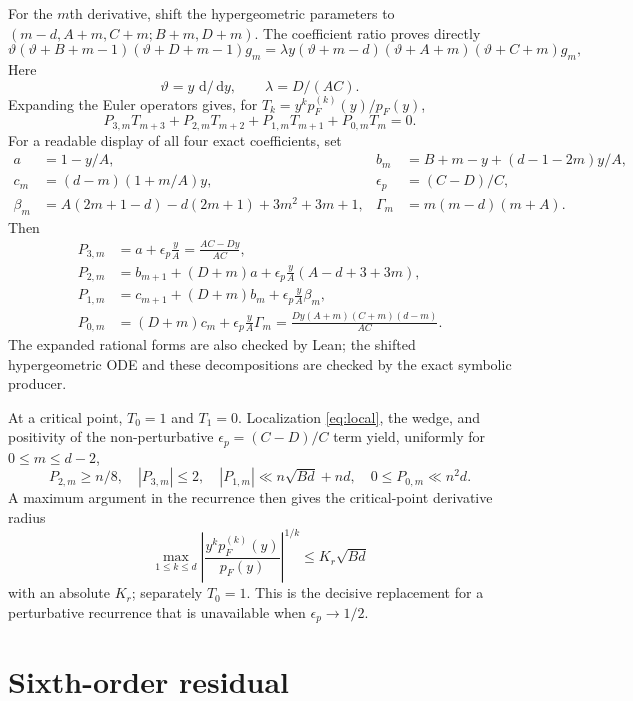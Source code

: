 \documentclass[11pt]{article}
\theoremstyle{definition}
\theoremstyle{remark}
\newcommand{\dd}{\,\mathrm d}
\begin{document}
For the $m$th derivative, shift the hypergeometric parameters to
$(m-d,A+m,C+m;B+m,D+m)$.  The coefficient ratio proves directly
\[
 \vartheta(\vartheta+B+m-1)(\vartheta+D+m-1)g_m
 =\lambda y(\vartheta+m-d)(\vartheta+A+m)(\vartheta+C+m)g_m,
\]
Here
\[
 \vartheta=y\,\dd/\dd y,\qquad \lambda=D/(AC).
\]
Expanding the Euler operators gives, for
$T_k=y^kp_F^{(k)}(y)/p_F(y)$,
\[
 P_{3,m}T_{m+3}+P_{2,m}T_{m+2}
 +P_{1,m}T_{m+1}+P_{0,m}T_m=0.
\]
For a readable display of all four exact coefficients, set
\begin{align*}
 a&=1-y/A,&
 b_m&=B+m-y+(d-1-2m)y/A,\\
 c_m&=(d-m)(1+m/A)y,&
 \epsilon_p&=(C-D)/C,\\
 \beta_m&=A(2m+1-d)-d(2m+1)+3m^2+3m+1,&
 \Gamma_m&=m(m-d)(m+A).
\end{align*}
Then
\begin{align*}
 P_{3,m}&=a+\epsilon_p\frac yA=\frac{AC-Dy}{AC},\\
 P_{2,m}&=b_{m+1}+(D+m)a
   +\epsilon_p\frac yA(A-d+3+3m),\\
 P_{1,m}&=c_{m+1}+(D+m)b_m
   +\epsilon_p\frac yA\beta_m,\\
 P_{0,m}&=(D+m)c_m+\epsilon_p\frac yA\Gamma_m
   =\frac{Dy(A+m)(C+m)(d-m)}{AC}.
\end{align*}
The expanded rational forms are also checked by Lean; the shifted
hypergeometric ODE and these decompositions are checked by the exact
symbolic producer.

At a critical point, $T_0=1$ and $T_1=0$.  Localization
\eqref{eq:local}, the wedge, and positivity of the non-perturbative
$\epsilon_p=(C-D)/C$ term yield, uniformly for $0\le m\le d-2$,
\[
 P_{2,m}\ge n/8,\quad |P_{3,m}|\le2,\quad
 |P_{1,m}|\ll n\sqrt{Bd}+nd,\quad 0\le P_{0,m}\ll n^2d.
\]
A maximum argument in the recurrence then gives the critical-point
derivative radius
\begin{equation}\label{eq:radius}
 \max_{1\le k\le d}
 \left|\frac{y^kp_F^{(k)}(y)}{p_F(y)}\right|^{1/k}
 \le K_r\sqrt{Bd}
\end{equation}
with an absolute $K_r$; separately $T_0=1$.  This is the decisive replacement for a perturbative
recurrence that is unavailable when $\epsilon_p\to1/2$.

\section{Sixth-order residual}\label{sec:residual}
\end{document}
